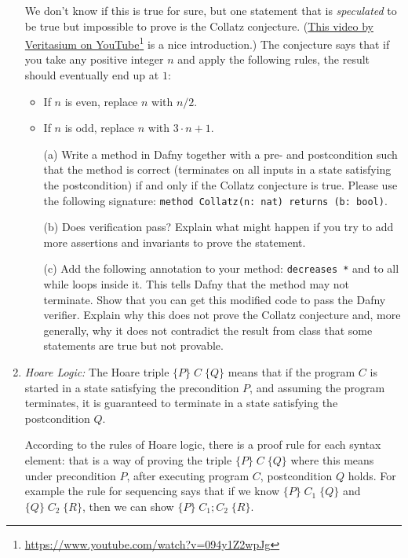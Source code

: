 \documentclass{article}
\newcommand{\visiblehref}[2]{\href{#1}{#2}\footnote{\url{#1}}}
\newcommand{\hoare}[3]{\{#1\} \; #2 \; \{#3\}}
\begin{document}
\begin{enumerate}
We don't know if this is true for sure, but one statement that is \emph{speculated} to be true but impossible to prove is the Collatz conjecture.
(\visiblehref{https://www.youtube.com/watch?v=094y1Z2wpJg}{This video by Veritasium on YouTube} is a nice introduction.)
The conjecture says that if you take any positive integer $n$ and apply the following rules, the result should eventually end up at $1$:
\begin{itemize}
\item If $n$ is even, replace $n$ with $n / 2$.
\item If $n$ is odd, replace $n$ with $3 \cdot n + 1$.
\end{itemize}

\begin{enumerate}
\item[(a)]
Write a method in Dafny together with a pre- and postcondition
such that the method is correct (terminates on all inputs in a state satisfying the postcondition)
if and only if the Collatz conjecture is true. Please use the following signature: \texttt{method Collatz(n: nat) returns (b: bool)}.

\item[(b)]
Does verification pass?
Explain what might happen if you try to add more assertions and invariants to prove the statement.

\item[(c)]
Add the following annotation to your method:
\texttt{decreases *} and to all while loops inside it.
This tells Dafny that the method may not terminate.
Show that you can get this modified code to pass the Dafny verifier.
Explain why this does not prove the Collatz conjecture and, more generally,
why it does not contradict the result from class that some statements are true but not provable.

\end{enumerate}

\item
\emph{Hoare Logic:}
The Hoare triple $\hoare{P}{C}{Q}$ means that if the program $C$ is started in a state
satisfying the precondition $P$, and assuming the program terminates,
it is guaranteed to terminate in a state satisfying the postcondition $Q$.

According to the rules of Hoare logic,
there is a proof rule for each syntax element: that is a way of proving
the triple $\hoare{P}{C}{Q}$ where this means under precondition $P$, after executing program $C$, postcondition $Q$ holds.
For example the rule for sequencing says that if we know $\hoare{P}{C_1}{Q}$ and $\hoare{Q}{C_2}{R}$,
then we can show $\hoare{P}{C_1; C_2}{R}$.


\end{enumerate}
\end{document}
